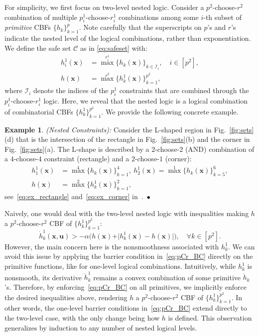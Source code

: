 \documentclass[journal,twoside,web]{ieeecolor}
\newcommand{\until}[1]{[#1]}
\newcommand{\longthmtitle}[1]{\mbox{}{\textit{(#1):}}}
\newcommand{\Cc}{\mathcal{C}}
\newcommand{\Ic}{\mathcal{I}}
\theoremstyle{definition}
\newtheorem{example}{Example}
\newcommand{\bu}{\mathbf{u}}
\newcommand{\bx}{\mathbf{x}}
\begin{document}
For simplicity, we first focus on two-level nested logic. Consider a $p^2$-choose-$r^2$ combination of multiple $p^1_i$-choose-$r^1_i$ combinations among some $i$-th subset of \textit{primitive} CBFs $\{h_k\}_{k=1}^p$. Note carefully  that the superscripts on $p$'s and $r$'s  indicate the nested level of the logical combinations, rather than exponentiation. We define the safe set $\Cc$ as in \eqref{eq:safeset} with:
\begin{equation}
\begin{aligned}
    h_i^1(\bx) & = \max^{r^1_i}\{h_k(\bx)\}_{k\in\Ic_i},
    \quad i \in \until{p^2}, \\
    h(\bx) & =
    \max^{r^2} \{h_k^{1}(\bx)\}_{k=1}^{p^2},
\end{aligned}
\end{equation}
where $\Ic_i$ denote the indices of the $p^1_i$ constraints that are combined through the $p^1_i$-choose-$r^1_i$ logic. Here, we reveal that the nested logic is a logical combination of combinatorial CBFs $\{h_k^1\}_{k=1}^{p^2}$. We provide the following  concrete example.

\begin{example}\longthmtitle{Nested Constraints}
\label{ex:L-shape}
Consider the L-shaped region in Fig.~\ref{fig:sets}(d) that is the intersection of the rectangle in Fig.~\ref{fig:sets}(b) and the corner in Fig.~\ref{fig:sets}(a).
The L-shape is described by a $2$-choose-$2$ (AND) combination of a $4$-choose-$4$ constraint (rectangle) and a $2$-choose-$1$ (corner):
\begin{align}
    h_1^1(\bx) &= \max^4\{h_k(\bx)\}_{k=1}^4,~h_2^1(\bx) = \max^1\{h_k(\bx)\}_{k=5}^6, \nonumber \\
    h(\bx) &= \max^2 \{h_k^{1}(\bx)\}_{k=1}^{2}, \label{eq:two_nested_CBF}
\end{align}
see~\eqref{eq:ex_rectangle} and~\eqref{eq:ex_corner} in~.~\hfill $\bullet$
\end{example}

Naively, one would deal with the two-level nested logic with inequalities making $h$ a $p^2$-choose-$r^2$ CBF of $\{h_k^{1}\}_{k=1}^{p^2}$:
$$
    \dot h^1_k(\bx,\bu) > -\alpha \big( h(\bx)+\vert h^1_k(\bx)-h(\bx)\vert \big), \quad \forall k\in\until{p^2}.
$$
However, the main concern here is the nonsmoothness associated with $h_k^1$. We can avoid this issue by applying the barrier condition in~\eqref{eq:pCr_BC} directly on the primitive functions, like for one-level logical combinations. Intuitively, while $h_k^1$ is nonsmooth, its derivative $\dot h_k^1$ remains a convex combination of some primitive $\dot h_k$'s. Therefore, by enforcing~\eqref{eq:pCr_BC} on all primitives, we implicitly enforce the desired inequalities above, rendering $h$ a $p^2$-choose-$r^2$ CBF of $\{h^1_k\}_{k=1}^{p^2}$. In other words, the one-level barrier conditions in~\eqref{eq:pCr_BC} extend directly to the two-level case, with the only change being how $h$ is defined. This observation generalizes by induction to any number of nested logical levels.
\end{document}
